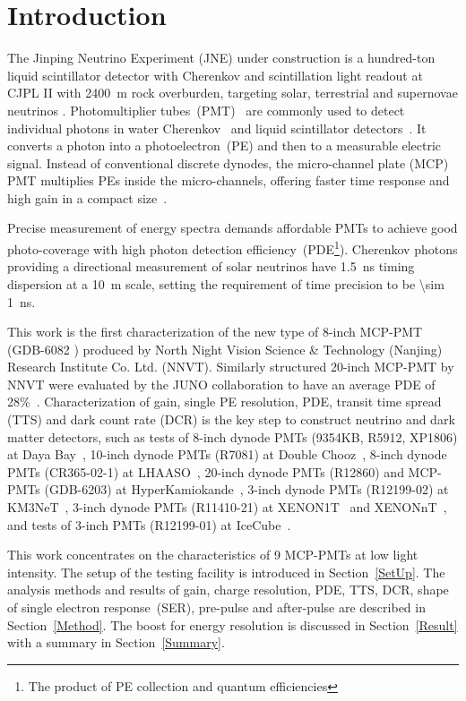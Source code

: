 \section{Introduction}
The Jinping Neutrino Experiment (JNE) under construction is a hundred-ton liquid scintillator detector with Cherenkov and scintillation light readout
 at CJPL II with \SI{2400}{m} rock overburden, targeting solar, terrestrial and supernovae neutrinos \cite{LetterJNE2017,xu_jinping_2020,xu_innovations_2022,xu_design_2022}.
Photomultiplier tubes~(PMT)~\cite{HAMAMATSUManual} are commonly used to detect individual photons in water Cherenkov~\cite{SNO,SuperK} and liquid scintillator detectors~\cite{KamLAND,JUNO:2015zny}. It converts a photon into a photoelectron~(PE) and then to a measurable electric signal.  Instead of conventional discrete dynodes, the micro-channel plate (MCP) PMT multiplies PEs inside the micro-channels, offering faster time response and high gain in a compact size~\cite{HAMAMATSUManual}.

Precise measurement of energy spectra demands affordable PMTs to achieve good photo-coverage with high photon detection efficiency~(PDE\footnote{The product of PE collection and quantum efficiencies}). Cherenkov photons providing a directional measurement of solar neutrinos have \SI{1.5}{ns} timing dispersion at a \SI{10}{m} scale, setting the requirement of time precision to be \SI{\sim 1}{ns}.


This work is the first characterization of
 the new type of 8-inch MCP-PMT (GDB-6082 \cite{GDB-6082}) produced by North Night Vision Science \& Technology (Nanjing) Research Institute Co. Ltd. (NNVT). %
Similarly structured 20-inch MCP-PMT by NNVT were evaluated by the JUNO collaboration to have an average PDE of 28\%~\cite{JUNOMassTesting}.
Characterization of gain, single PE resolution, PDE, transit time spread (TTS) and dark count rate (DCR) is the key step to construct neutrino and dark matter detectors, such as tests of
 8-inch dynode PMTs (9354KB, R5912, XP1806) at Daya Bay~\cite{DayaBayTesting}, 10-inch dynode PMTs (R7081) at Double Chooz~\cite{DoubleChoozeTesting}, 8-inch dynode PMTs (CR365-02-1) at LHAASO~\cite{LHAASOTesting}, 20-inch dynode PMTs (R12860) and MCP-PMTs (GDB-6203) at HyperKamiokande~\cite{HyperKTesting}, 3-inch dynode PMTs (R12199-02) at KM3NeT~\cite{KM3NetTesting}, 3-inch dynode PMTs (R11410-21) at XENON1T~\cite{XENON1TTesting} and XENONnT~\cite{XENONnTTesting}, and tests of 3-inch PMTs (R12199-01) at IceCube~\cite{IceCubeTesting}.

This work concentrates on the characteristics of 9 MCP-PMTs at low light intensity. The setup of the testing facility is introduced in Section~\ref{SetUp}. The analysis methods and results of gain, charge resolution, PDE, TTS, DCR, shape of single electron response~(SER), pre-pulse and after-pulse are described in Section~\ref{Method}. The boost for energy resolution is discussed in Section~\ref{Result} with a summary in Section~\ref{Summary}.
